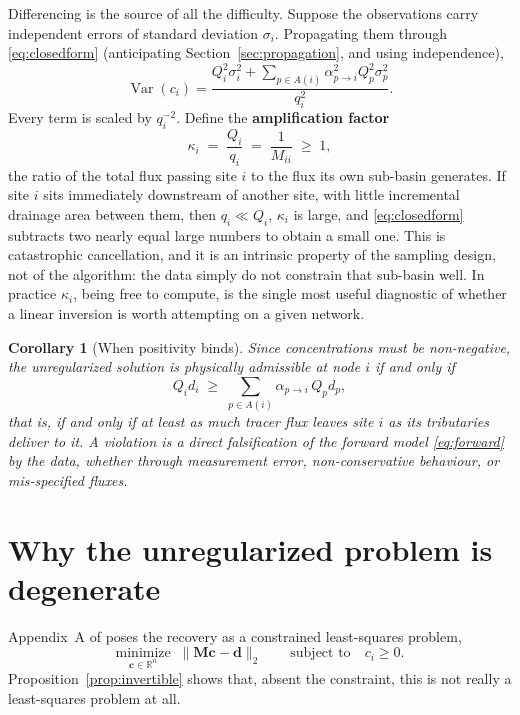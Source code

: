 \documentclass[11pt]{article}
\newcommand{\cvec}{\ensuremath{\mathbf{c}}\xspace}
\newcommand{\dvec}{\ensuremath{\mathbf{d}}\xspace}
\newcommand{\Mmat}{\ensuremath{\mathbf{M}}\xspace}
\newcommand{\Reals}{\ensuremath{\mathbb{R}}\xspace}
\newtheorem{corollary}[theorem]{Corollary}
\theoremstyle{definition}
\begin{document}
Differencing is the source of all the difficulty. Suppose the observations carry independent
errors of standard deviation $\sigma_i$. Propagating them through \eqref{eq:closedform}
(anticipating Section~\ref{sec:propagation}, and using independence),
\begin{equation}
  \operatorname{Var}(c_i)
  = \frac{Q_i^2 \sigma_i^2 + \sum_{p \in A(i)} \alpha_{p\to i}^2 Q_p^2 \sigma_p^2}{q_i^2} .
  \label{eq:varc}
\end{equation}
Every term is scaled by $q_i^{-2}$. Define the \textbf{amplification factor}
\begin{equation}
  \kappa_i \;=\; \frac{Q_i}{q_i} \;=\; \frac{1}{M_{ii}} \;\ge\; 1 ,
  \label{eq:kappa}
\end{equation}
the ratio of the total flux passing site $i$ to the flux its own sub-basin generates. If
site $i$ sits immediately downstream of another site, with little incremental drainage area
between them, then $q_i \ll Q_i$, $\kappa_i$ is large, and \eqref{eq:closedform} subtracts two
nearly equal large numbers to obtain a small one. This is catastrophic cancellation, and it is
an intrinsic property of the sampling design, not of the algorithm: the data simply do not
constrain that sub-basin well. In practice $\kappa_i$, being free to compute, is the single
most useful diagnostic of whether a linear inversion is worth attempting on a given network.

\begin{corollary}[When positivity binds]\label{cor:positivity}
Since concentrations must be non-negative, the unregularized solution is physically admissible
at node $i$ if and only if
\begin{equation}
  Q_i d_i \;\ge\; \sum_{p \in A(i)} \alpha_{p \to i} \, Q_p d_p ,
  \label{eq:positivity}
\end{equation}
that is, if and only if at least as much tracer flux leaves site $i$ as its tributaries deliver
to it. A violation is a direct falsification of the forward model \eqref{eq:forward} by the
data, whether through measurement error, non-conservative behaviour, or mis-specified fluxes.
\end{corollary}

\section{Why the unregularized problem is degenerate}
\label{sec:degenerate}

Appendix~A of \textcite{barnes_using_2024} poses the recovery as a constrained least-squares
problem,
\begin{equation}
  \underset{\cvec \in \Reals^n}{\text{minimize}} \;\; \lVert \Mmat\cvec - \dvec \rVert_2
  \qquad \text{subject to} \quad c_i \ge 0 .
  \label{eq:appendixproblem}
\end{equation}
Proposition~\ref{prop:invertible} shows that, absent the constraint, this is not really a
least-squares problem at all.
\end{document}
